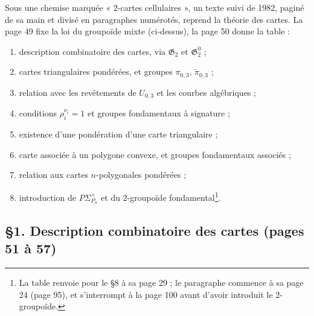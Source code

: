 \documentclass[11pt,a4paper]{article}
\begin{document}
Sous une chemise marquée « 2-cartes cellulaires », un texte suivi de 1982,
paginé de sa main et divisé en paragraphes numérotés, reprend la théorie des
cartes. La page 49 fixe la loi du groupoïde mixte (ci-dessus), la page 50
donne la table :
\begin{enumerate}
\item description combinatoire des cartes, via $\mathfrak{G}_2$ et $\mathfrak{G}_2^0$ ;
\item cartes triangulaires pondérées, et groupes $\pi_{0,3}$, $\tilde\pi_{0,3}$ ;
\item relation avec les revêtements de $U_{0,3}$ et les courbes algébriques ;
\item conditions $\rho_i^{\nu_i} = 1$ et groupes fondamentaux à signature ;
\item existence d'une pondération d'une carte triangulaire ;
\item carte associée à un polygone convexe, et groupes fondamentaux associés ;
\item relation aux cartes $n$-polygonales pondérées ;
\item introduction de $P\Sigma^{\times}_{P_n}$ et du $2$-groupoïde
fondamental\footnote{La table renvoie pour le §8 à sa page 29 ; le
paragraphe commence à sa page 24 (page 95), et s'interrompt à la page 100
avant d'avoir introduit le $2$-groupoïde.}.
\end{enumerate}

\subsection*{§1. Description combinatoire des cartes (pages 51 à 57)}
\end{document}
